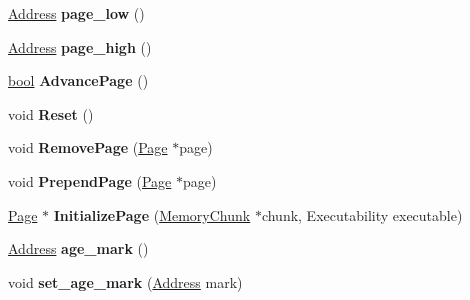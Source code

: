 \begin{DoxyCompactItemize}
\mbox{\hyperlink{classuintptr__t}{Address}} {\bfseries page\+\_\+low} ()
\item 
\mbox{\label{classv8_1_1internal_1_1SemiSpace_a1215003e1c658acd5ecb782063880833}} 
\mbox{\hyperlink{classuintptr__t}{Address}} {\bfseries page\+\_\+high} ()
\item 
\mbox{\label{classv8_1_1internal_1_1SemiSpace_a3a3a17fe0cd6b823613b324e1f352b46}} 
\mbox{\hyperlink{classbool}{bool}} {\bfseries Advance\+Page} ()
\item 
\mbox{\label{classv8_1_1internal_1_1SemiSpace_a14dc89b6ec2d58c43fe3799cd8e54c38}} 
void {\bfseries Reset} ()
\item 
\mbox{\label{classv8_1_1internal_1_1SemiSpace_a4276ad0d5dc9e4aa7a45c0925ad44407}} 
void {\bfseries Remove\+Page} (\mbox{\hyperlink{classv8_1_1internal_1_1Page}{Page}} $\ast$page)
\item 
\mbox{\label{classv8_1_1internal_1_1SemiSpace_a76d296a748a8b1e8cfe9354cfd02f488}} 
void {\bfseries Prepend\+Page} (\mbox{\hyperlink{classv8_1_1internal_1_1Page}{Page}} $\ast$page)
\item 
\mbox{\label{classv8_1_1internal_1_1SemiSpace_a415f0c18100664d97f9c91ceb1986257}} 
\mbox{\hyperlink{classv8_1_1internal_1_1Page}{Page}} $\ast$ {\bfseries Initialize\+Page} (\mbox{\hyperlink{classv8_1_1internal_1_1MemoryChunk}{Memory\+Chunk}} $\ast$chunk, Executability executable)
\item 
\mbox{\label{classv8_1_1internal_1_1SemiSpace_a96d84b4c29550486b8600a8601b269ce}} 
\mbox{\hyperlink{classuintptr__t}{Address}} {\bfseries age\+\_\+mark} ()
\item 
\mbox{\label{classv8_1_1internal_1_1SemiSpace_aab39f62197f82066a5b293869ee2fc44}} 
void {\bfseries set\+\_\+age\+\_\+mark} (\mbox{\hyperlink{classuintptr__t}{Address}} mark)
\item 
\mbox{\label{classv8_1_1internal_1_1SemiSpace_adb4f89e009cfa54a140323f7309f3406}} 

\end{DoxyCompactItemize}
